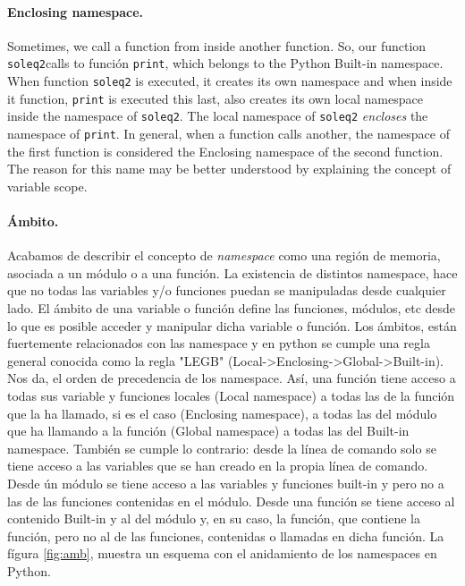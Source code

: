 \begin{paracol}{2}
\paragraph{Enclosing namespace.} Sometimes, we call a function from inside another function. So, our function \texttt{soleq2}calls to función \texttt{print}, which belongs to the Python Built-in namespace. When function \texttt{soleq2} is executed, it creates its own namespace and when inside it function, \texttt{print} is executed this last, also creates its own local namespace inside the namespace of \texttt{soleq2}. The local namespace of \texttt{soleq2} \emph{encloses} the namespace of \texttt{print}. 
In general, when a function calls another, the namespace of the first function is considered the Enclosing namespace of the second function. The reason for this name may be better understood by explaining the concept of variable scope.

\switchcolumn
\paragraph{Ámbito.} Acabamos de describir el concepto de \emph{namespace} como una región de memoria, asociada a un módulo o a una función. La existencia de distintos namespace, hace que no todas las variables y/o funciones puedan se manipuladas desde cualquier lado. El ámbito de una variable o función define las funciones, módulos, etc desde lo que es posible acceder y manipular dicha variable o función. Los ámbitos, están fuertemente relacionados con las namespace y en python se cumple una regla general conocida como la regla "LEGB" (Local->Enclosing->Global->Built-in). Nos da, el orden de precedencia de los namespace. Así, una función tiene acceso a todas sus variable y funciones locales (Local namespace) a todas las de la función que la ha llamado, si es el caso (Enclosing namespace), a todas las del módulo que ha llamando a la función (Global namespace) a todas las del Built-in namespace. También se cumple lo contrario: desde la línea de comando solo se tiene acceso a las variables que se han creado en la propia línea de comando. Desde ún módulo se tiene acceso a las variables y funciones built-in y pero no a las de las funciones contenidas en el módulo.
Desde una función se tiene acceso al contenido Built-in y al del módulo y, en su caso, la función, que contiene la función, pero no al de las funciones, contenidas o llamadas en dicha función.
La fígura \ref{fig:amb}, muestra un esquema con el anidamiento de los namespaces en Python.
\switchcolumn

\end{paracol}
